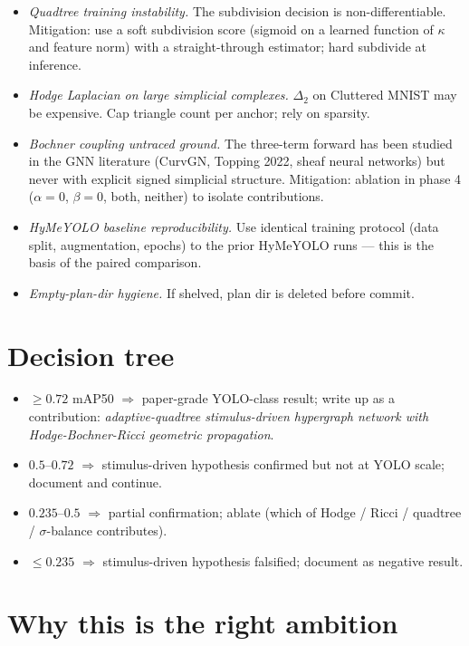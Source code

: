 \documentclass[11pt,a4paper]{article}
\newcommand{\sig}{\ensuremath{\sigma}}
\begin{document}
\begin{itemize}
\item \emph{Quadtree training instability.} The subdivision decision is
  non-differentiable. Mitigation: use a soft subdivision score (sigmoid
  on a learned function of $\kappa$ and feature norm) with a
  straight-through estimator; hard subdivide at inference.
\item \emph{Hodge Laplacian on large simplicial complexes.}
  $\Delta_2$ on Cluttered MNIST may be expensive. Cap triangle count
  per anchor; rely on sparsity.
\item \emph{Bochner coupling untraced ground.} The three-term forward
  has been studied in the GNN literature (CurvGN, Topping 2022, sheaf
  neural networks) but never with explicit signed simplicial structure.
  Mitigation: ablation in phase 4 ($\alpha = 0$, $\beta = 0$, both,
  neither) to isolate contributions.
\item \emph{HyMeYOLO baseline reproducibility.} Use identical training
  protocol (data split, augmentation, epochs) to the prior HyMeYOLO
  runs --- this is the basis of the paired comparison.
\item \emph{Empty-plan-dir hygiene.} If shelved, plan dir is deleted before commit.
\end{itemize}

\section{Decision tree}

\begin{itemize}
\item $\geq 0.72$ mAP50 $\Rightarrow$ paper-grade YOLO-class result;
  write up as a contribution: \emph{adaptive-quadtree stimulus-driven
  hypergraph network with Hodge-Bochner-Ricci geometric propagation}.
\item $0.5$--$0.72$ $\Rightarrow$ stimulus-driven hypothesis confirmed
  but not at YOLO scale; document and continue.
\item $0.235$--$0.5$ $\Rightarrow$ partial confirmation; ablate (which
  of Hodge / Ricci / quadtree / $\sig$-balance contributes).
\item $\leq 0.235$ $\Rightarrow$ stimulus-driven hypothesis falsified;
  document as negative result.
\end{itemize}

\section{Why this is the right ambition}
\end{document}
